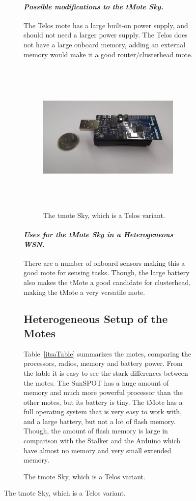 \begin{figure}
\begin{figure}
	
	\paragraph{\emph{Possible modifications to the tMote Sky.}}
	The Telos mote has a large built-on power supply, and should not need a larger
	power supply. 
	The Telos does not have a large onboard memory, adding an external
	memory would make it a good router/clusterhead mote.
	
		
\begin{figure}[htbp]
	\centering
		\includegraphics[height=3in]{images/motes/tmoteOneSide.jpg}
	\caption{The tmote Sky, which is a Telos variant.}
	\label{fig:images_motes_tmoteOneSide}
\end{figure}

	\paragraph{\emph{Uses for the tMote Sky in a Heterogeneous WSN.}}
	There are a number of onboard sensors making this a good mote for
	sensing tasks. Though, the large battery also makes the tMote a good candidate for 
	clusterhead, making the tMote a very versatile mote.
	

\subsection{Heterogeneous Setup of the Motes}	
Table~\ref{itsaTable} summarizes the motes, comparing the processors, radios, memory and battery power.
From the table it is easy to see the stark differences between the motes. The SunSPOT 
has a huge amount of memory and much more powerful processor than the
other motes, but its battery is tiny. The tMote has a
full operating system that is very easy to work with, and 
a large battery, but not a lot of flash memory. Though, the amount of flash memory is 
large in comparison with the Stalker and the Arduino which have almost no memory and very small extended memory.


\end{figure}
\end{figure}
